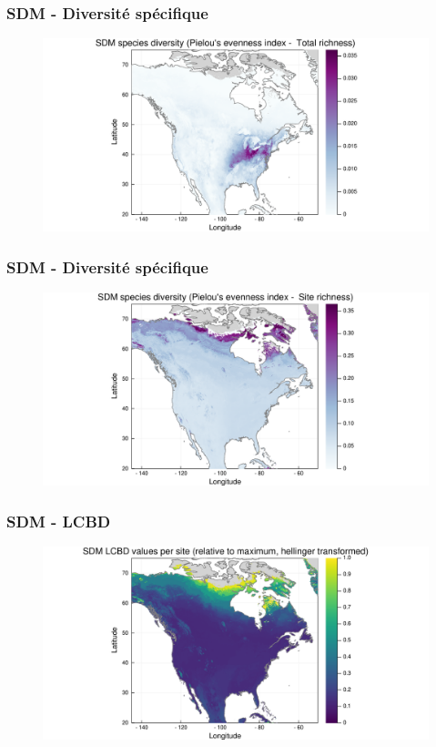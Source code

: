 \documentclass[10pt]{beamer}
\begin{document}
\begin{frame}
  \frametitle{SDM - Diversité spécifique}
  \begin{figure}
    \centering
    \hspace*{-2cm}\includegraphics[scale=0.5]{../fig/sdm/sdm-diversity-pielou2.pdf}
  \end{figure}
\end{frame}

\begin{frame}
  \frametitle{SDM - Diversité spécifique}
  \begin{figure}
    \centering
    \hspace*{-2cm}\includegraphics[scale=0.5]{../fig/sdm/sdm-diversity-pielou.pdf}
  \end{figure}
\end{frame}

\begin{frame}
  \frametitle{SDM - LCBD}
  \begin{figure}
    \centering
    \hspace*{-2cm}\includegraphics[scale=0.5]{../fig/sdm/sdm-lcbd-transf.pdf}
  \end{figure}
\end{frame}
\end{document}
